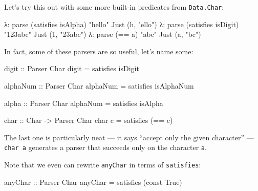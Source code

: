\documentclass[]{article}
\newenvironment{Shaded}{}{}
\newcommand{\CharTok}[1]{\textcolor[rgb]{0.25,0.44,0.63}{#1}}
\newcommand{\DataTypeTok}[1]{\textcolor[rgb]{0.56,0.13,0.00}{#1}}
\newcommand{\FunctionTok}[1]{\textcolor[rgb]{0.02,0.16,0.49}{#1}}
\newcommand{\NormalTok}[1]{#1}
\newcommand{\OperatorTok}[1]{\textcolor[rgb]{0.40,0.40,0.40}{#1}}
\newcommand{\OtherTok}[1]{\textcolor[rgb]{0.00,0.44,0.13}{#1}}
\newcommand{\StringTok}[1]{\textcolor[rgb]{0.25,0.44,0.63}{#1}}
\begin{document}
Let's try this out with some more built-in predicates from \texttt{Data.Char}:

\begin{Shaded}
\begin{Highlighting}[]
\NormalTok{λ}\OperatorTok{:}\NormalTok{ parse (satisfies }\FunctionTok{isAlpha}\NormalTok{) }\StringTok{"hello"}
\DataTypeTok{Just}\NormalTok{ (}\CharTok{\textquotesingle{}h\textquotesingle{}}\NormalTok{, }\StringTok{"ello"}\NormalTok{)}
\NormalTok{λ}\OperatorTok{:}\NormalTok{ parse (satisfies }\FunctionTok{isDigit}\NormalTok{) }\StringTok{"123abc"}
\DataTypeTok{Just}\NormalTok{ (}\CharTok{\textquotesingle{}1\textquotesingle{}}\NormalTok{, }\StringTok{"23abc"}\NormalTok{)}
\NormalTok{λ}\OperatorTok{:}\NormalTok{ parse (}\OperatorTok{==} \CharTok{\textquotesingle{}a\textquotesingle{}}\NormalTok{) }\StringTok{"abc"}
\DataTypeTok{Just}\NormalTok{ (}\CharTok{\textquotesingle{}a\textquotesingle{}}\NormalTok{, }\StringTok{"bc"}\NormalTok{)}
\end{Highlighting}
\end{Shaded}

In fact, some of these parsers are so useful, let's name some:

\begin{Shaded}
\begin{Highlighting}[]
\OtherTok{digit ::} \DataTypeTok{Parser} \DataTypeTok{Char}
\NormalTok{digit }\OtherTok{=}\NormalTok{ satisfies }\FunctionTok{isDigit}

\OtherTok{alphaNum ::} \DataTypeTok{Parser} \DataTypeTok{Char}
\NormalTok{alphaNum }\OtherTok{=}\NormalTok{ satisfies }\FunctionTok{isAlphaNum}

\OtherTok{alpha ::} \DataTypeTok{Parser} \DataTypeTok{Char}
\NormalTok{alphaNum }\OtherTok{=}\NormalTok{ satisfies }\FunctionTok{isAlpha}

\OtherTok{char ::} \DataTypeTok{Char} \OtherTok{{-}>} \DataTypeTok{Parser} \DataTypeTok{Char}
\NormalTok{char c }\OtherTok{=}\NormalTok{ satisfies (}\OperatorTok{==}\NormalTok{ c)}
\end{Highlighting}
\end{Shaded}

The last one is particularly neat --- it says ``accept only the given
character'' --- \texttt{char\ \textquotesingle{}a\textquotesingle{}} generates a
parser that succeeds only on the character \texttt{a}.

Note that we even can rewrite \texttt{anyChar} in terms of \texttt{satisfies}:

\begin{Shaded}
\begin{Highlighting}[]
\OtherTok{anyChar ::} \DataTypeTok{Parser} \DataTypeTok{Char}
\NormalTok{anyChar }\OtherTok{=}\NormalTok{ satisfies (}\FunctionTok{const} \DataTypeTok{True}\NormalTok{)}
\end{Highlighting}
\end{Shaded}
\end{document}
